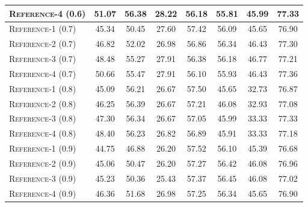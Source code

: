 \begin{table*}[ht]
{\begin{tabular}{l|ccccccc}
\textsc{Reference}-4 (0.6)& 51.07 & 56.38 & 28.22 & 56.18 & 55.81 & 45.99 & 77.33 \\
\midrule
\textsc{Reference}-1 (0.7)& 45.34 & 50.45 & 27.60 & 57.42 & 56.09 & 45.65 & 76.90 \\
\textsc{Reference}-2 (0.7)& 46.82 & 52.02 & 26.98 & 56.86 & 56.34 & 46.43 & 77.30 \\
\textsc{Reference}-3 (0.7)& 48.48 & 55.27 & 27.91 & 56.38 & 56.18 & 46.77 & 77.21 \\
\textsc{Reference}-4 (0.7)& 50.66 & 55.47 & 27.91 & 56.10 & 55.93 & 46.43 & 77.36 \\
\midrule
\textsc{Reference}-1 (0.8)& 45.09 & 56.21 & 26.67 & 57.50 & 45.65 & 32.73 & 76.87 \\
\textsc{Reference}-2 (0.8)& 46.25 & 56.39 & 26.67 & 57.21 & 46.08 & 32.93 & 77.08 \\
\textsc{Reference}-3 (0.8)& 47.30 & 56.34 & 26.67 & 57.05 & 45.99 & 33.33 & 77.33 \\
\textsc{Reference}-4 (0.8)& 48.40 & 56.23 & 26.82 & 56.89 & 45.91 & 33.33 & 77.18 \\
\midrule
\textsc{Reference}-1 (0.9) & 44.75 & 46.88 & 26.20 & 57.52 & 56.10 & 45.39 & 76.68  \\
\textsc{Reference}-2 (0.9) & 45.06 & 50.47 & 26.20 & 57.27 & 56.42 & 46.08 & 76.96  \\
\textsc{Reference}-3 (0.9)& 45.23 & 50.36 & 25.43 & 57.37 & 56.45 & 46.08 & 77.02  \\
\textsc{Reference}-4 (0.9) & 46.36 & 51.68 & 26.98 & 57.25 & 56.34 & 45.65 & 76.90 \\
\bottomrule
    \end{tabular}
    }
    \label{tab:impact_of_data_prop_with_iteration}
\end{table*}




